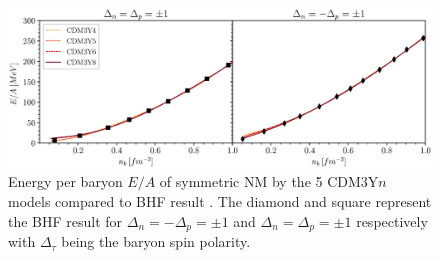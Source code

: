 \begin{figure}[t]
        \centering
        \includegraphics[width=\textwidth]{fig/BHF_fit.eps}
        \caption{Energy per baryon $E/A$ of symmetric \gls{NM} by the 5 CDM3Y$n$ models compared to \gls{BHF} result \cite{vidana2002equation}. The diamond and square represent the \gls{BHF} result for $\Delta_n=-\Delta_p=\pm 1$ and $\Delta_n=\Delta_p=\pm 1$ respectively with $\Delta_\tau$ being the baryon spin polarity.}
        \label{fig:bhf}
\end{figure} 

